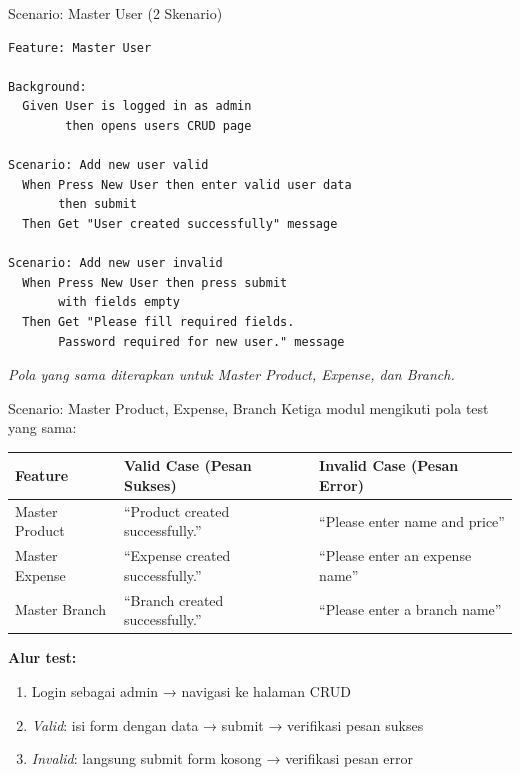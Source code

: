 \documentclass[aspectratio=169]{beamer}
\begin{document}
\begin{frame}[fragile]{Scenario: Master User (2 Skenario)}
\begin{lstlisting}[language={},title={masteruser.feature}]
Feature: Master User

Background:
  Given User is logged in as admin
        then opens users CRUD page

Scenario: Add new user valid
  When Press New User then enter valid user data
       then submit
  Then Get "User created successfully" message

Scenario: Add new user invalid
  When Press New User then press submit
       with fields empty
  Then Get "Please fill required fields.
       Password required for new user." message
\end{lstlisting}

  \vspace{0.3em}
  \small\textit{Pola yang sama diterapkan untuk Master Product, Expense, dan Branch.}
\end{frame}

\begin{frame}{Scenario: Master Product, Expense, Branch}
  Ketiga modul mengikuti pola test yang sama:

  \begin{table}[h]
    \centering\small
    \begin{tabular}{lll}
      \toprule
      \textbf{Feature} & \textbf{Valid Case (Pesan Sukses)} & \textbf{Invalid Case (Pesan Error)} \\
      \midrule
      Master Product & ``Product created successfully.'' & ``Please enter name and price'' \\
      Master Expense & ``Expense created successfully.'' & ``Please enter an expense name'' \\
      Master Branch  & ``Branch created successfully.''  & ``Please enter a branch name'' \\
      \bottomrule
    \end{tabular}
  \end{table}

  \vspace{0.5em}
  \textbf{Alur test:}
  \begin{enumerate}
    \item Login sebagai admin → navigasi ke halaman CRUD
    \item \textit{Valid}: isi form dengan data → submit → verifikasi pesan sukses
    \item \textit{Invalid}: langsung submit form kosong → verifikasi pesan error
  \end{enumerate}
\end{frame}
\end{document}
